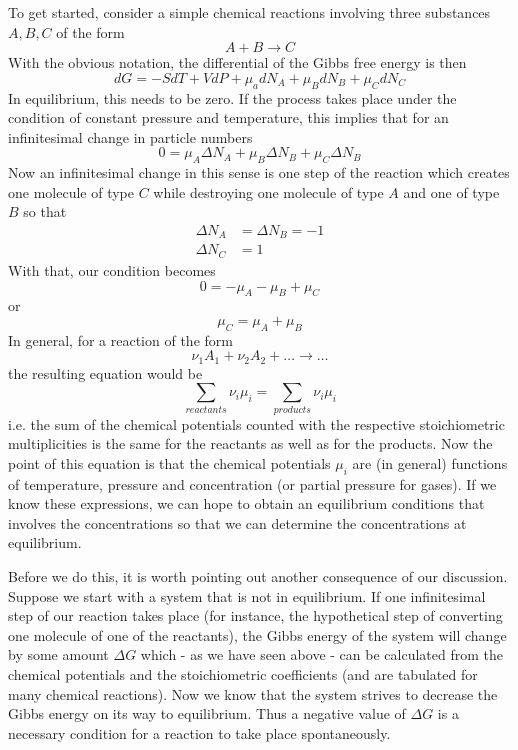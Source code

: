 \documentclass[a4paper, draft]{article}
\theoremstyle{own}
\theoremstyle{remark}
\begin{document}
To get started, consider a simple chemical reactions involving three substances $A, B, C$ of the form
$$
A + B \longrightarrow C
$$
With the obvious notation, the differential of the Gibbs free energy is then
$$
dG = - S dT + V dP + \mu_a dN_A + \mu_B dN_B + \mu_C dN_C
$$
In equilibrium, this needs to be zero. If the process takes place under the condition of constant pressure and temperature, this implies that for an infinitesimal change in particle numbers
$$
0 =  \mu_A \Delta N_A + \mu_B \Delta N_B + \mu_C \Delta N_B
$$
Now an infinitesimal change in this sense is one step of the reaction which creates one molecule of type $C$ while destroying one molecule of type $A$ and one of type $B$ so that
\begin{align*}
\Delta N_A &= \Delta N_B = -1 \\
\Delta N_C &= 1
\end{align*}
With that, our condition becomes
$$
0 = - \mu_A - \mu_B + \mu_C
$$
or
$$
\mu_C = \mu_A + \mu_B
$$
In general, for a reaction of the form
$$
\nu_1 A_1 + \nu_2 A_2 +  \dots \longrightarrow \dots
$$
the resulting equation would be 
$$
\sum_{reactants} \nu_i \mu_i = \sum_{products} \nu_i \mu_i
$$
i.e. the sum of the chemical potentials counted with the respective stoichiometric multiplicities is the same for the reactants as well as for the products. Now the point of this equation is that the chemical potentials $\mu_i$ are (in general) functions of temperature, pressure and concentration (or partial pressure for gases). If we know these expressions, we can hope to obtain an equilibrium conditions that involves the concentrations so that we can determine the concentrations at equilibrium.

Before we do this, it is worth pointing out another consequence of our discussion. Suppose we start with a system that is not in equilibrium. If one infinitesimal step of our reaction takes place (for instance, the hypothetical step of converting one molecule of one of the reactants), the Gibbs energy of the system will change by some amount $\Delta G$ which - as we have seen above - can be calculated from the chemical potentials and the stoichiometric coefficients (and are tabulated for many chemical reactions). Now we know that the system strives to decrease the Gibbs energy on its way to equilibrium. Thus a negative value of $\Delta G$ is a necessary condition for a reaction to take place spontaneously. 
\end{document}
